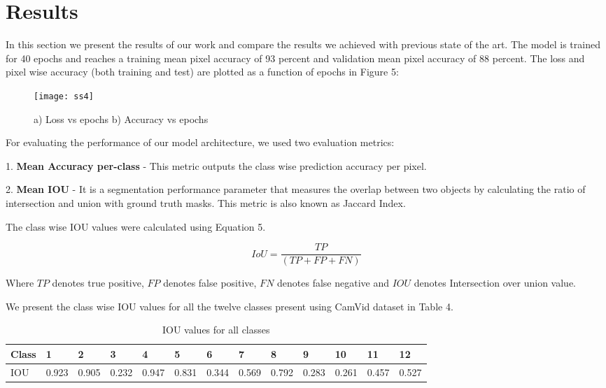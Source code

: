 \documentclass{article}
\begin{document}
\section{Results}

In this section we present the results of our work and compare the  results we achieved with previous state of the art. The model is trained for 40 epochs and reaches a training mean pixel accuracy of 93 percent and validation mean pixel accuracy of 88 percent. The loss and pixel wise accuracy (both training and test) are plotted as a function of epochs in Figure 5:

\begin{figure}[htp]
    \centering
    \texttt{[image: ss4]}
    \caption{a) Loss vs epochs b) Accuracy vs epochs}
    \label{fig4}
\end{figure}

For evaluating the performance of our model architecture, we used two evaluation metrics:

1. \textbf{Mean Accuracy per-class} - This metric outputs the class wise prediction accuracy per pixel.

2. \textbf{Mean IOU} - It is a segmentation performance parameter that measures the overlap between two objects by calculating the ratio of intersection and union with ground truth masks. This metric is also known as Jaccard Index. 

The class wise IOU values were calculated using Equation 5.

\begin{equation}
I o U=\frac{T P}{(T P+F P+F N)}    
\end{equation}

Where $TP$ denotes true positive, $FP$ denotes false positive, $FN$ denotes false negative and $IOU$ denotes Intersection over union value.

We present the class wise IOU values for all the twelve classes present using CamVid dataset in Table 4.

\begin{table}[h]
  \caption{IOU values for all classes}
  \label{sample-table4}
  \centering
  \begin{tabular}{lllllllllllll}
  \toprule
    Class &1 &2 &3 &4 &5 &6 &7 &8 &9 &10 &11 &12           \\
    \midrule
    IOU &0.923 &0.905 &0.232 &0.947 &0.831 &0.344 &0.569& 0.792 &0.283 &0.261 &0.457 &0.527          \\
    \bottomrule
  \end{tabular}
\end{table}
\end{document}
